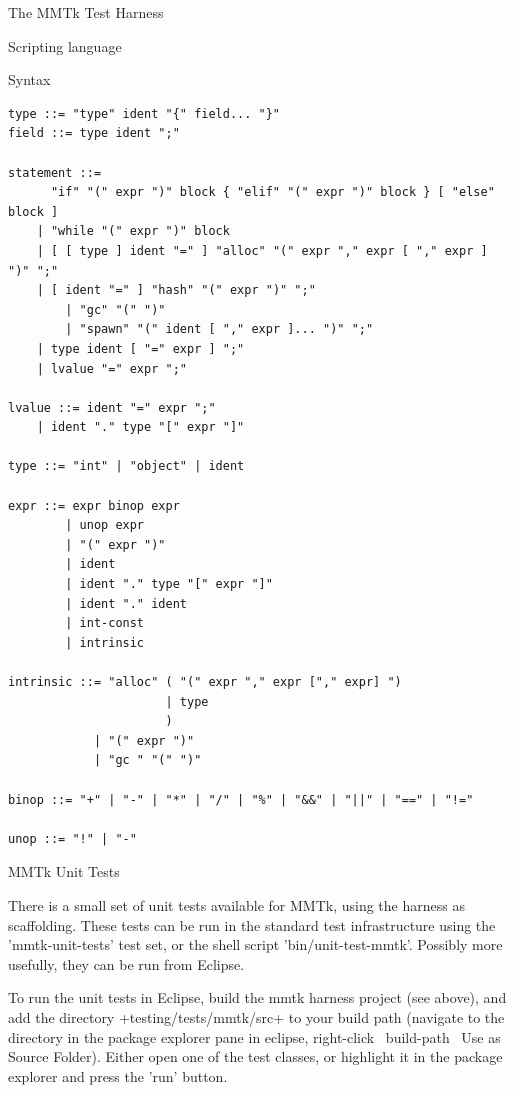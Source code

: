 \begin{section}{The MMTk Test Harness}
\begin{subsection}{Scripting language}
\begin{subsubsection}{Syntax}
\begin{lstlisting}
type ::= "type" ident "{" field... "}"
field ::= type ident ";"

statement ::=
	  "if" "(" expr ")" block { "elif" "(" expr ")" block } [ "else" block ]
	| "while "(" expr ")" block
	| [ [ type ] ident "=" ] "alloc" "(" expr "," expr [ "," expr ] ")" ";"
	| [ ident "=" ] "hash" "(" expr ")" ";"
        | "gc" "(" ")"
        | "spawn" "(" ident [ "," expr ]... ")" ";"
	| type ident [ "=" expr ] ";"
	| lvalue "=" expr ";"

lvalue ::= ident "=" expr ";"
	| ident "." type "[" expr "]"

type ::= "int" | "object" | ident

expr ::= expr binop expr
		| unop expr
		| "(" expr ")"
		| ident
		| ident "." type "[" expr "]"
		| ident "." ident
		| int-const
		| intrinsic

intrinsic ::= "alloc" ( "(" expr "," expr ["," expr] ")
                      | type
                      )
            | "(" expr ")"
            | "gc " "(" ")"

binop ::= "+" | "-" | "*" | "/" | "%" | "&&" | "||" | "==" | "!="

unop ::= "!" | "-"
\end{lstlisting}

\end{subsubsection}

\end{subsection}

\begin{subsection}{MMTk Unit Tests}

There is a small set of unit tests available for MMTk, using the harness as scaffolding.  These tests can be run in the standard test infrastructure using the 'mmtk-unit-tests' test set, or the shell script 'bin/unit-test-mmtk'.  Possibly more usefully, they can be run from Eclipse.

To run the unit tests in Eclipse, build the mmtk harness project (see above), and add the directory \spverb+testing/tests/mmtk/src+ to your build path (navigate to the directory in the package explorer pane in eclipse, right-click \textrightarrow\ build-path \textrightarrow\ Use as Source Folder).  Either open one of the test classes, or highlight it in the package explorer and press the 'run' button.

\end{subsection}

\end{section}
